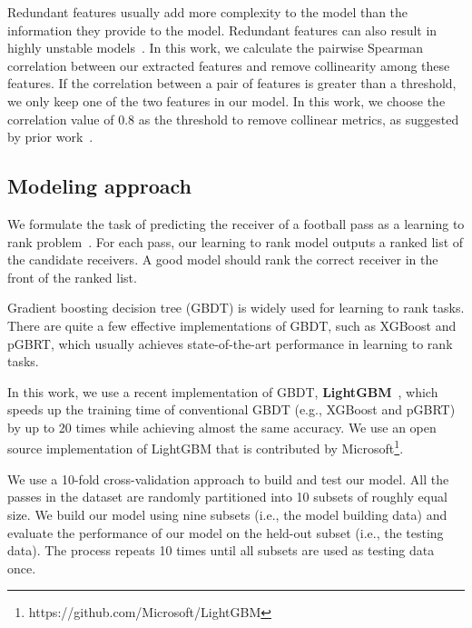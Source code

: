 Redundant features usually add more complexity to the model than the information they provide to the model. Redundant features can also result in highly unstable models~\cite{kuhn2013applied}.
In this work, we calculate the pairwise Spearman correlation between our extracted features and remove collinearity among these features.
If the correlation between a pair of features is greater than a threshold, we only keep one of the two features in our model.
In this work, we choose the correlation value of 0.8 as the threshold to remove collinear metrics, as suggested by prior work~\cite{kuhn2013applied}.

\subsection{Modeling approach}

We formulate the task of predicting the receiver of a football pass as a learning to rank problem~\cite{liu2009learning}. 
For each pass, our learning to rank model outputs a ranked list of the candidate receivers. 
A good model should rank the correct receiver in the front of the ranked list.

Gradient boosting decision tree (GBDT) is widely used for learning to rank tasks.
There are quite a few effective implementations of GBDT, such as XGBoost and pGBRT, which usually achieves state-of-the-art performance in learning to rank tasks.

In this work, we use a recent implementation of GBDT, \textbf{LightGBM}~\cite{NIPS2017_6907}, which speeds up the training time of conventional GBDT (e.g., XGBoost and pGBRT) by up to 20 times while achieving almost the same accuracy. 
We use an open source implementation of LightGBM that is contributed by Microsoft\footnote{https://github.com/Microsoft/LightGBM}.

We use a 10-fold cross-validation approach to build and test our model. 
All the passes in the dataset are randomly partitioned into 10 subsets of roughly equal size. 
We build our model using nine subsets (i.e., the model building data) and evaluate the performance of our model on the held-out subset (i.e., the testing data).
The process repeats 10 times until all subsets are used as testing data once.


